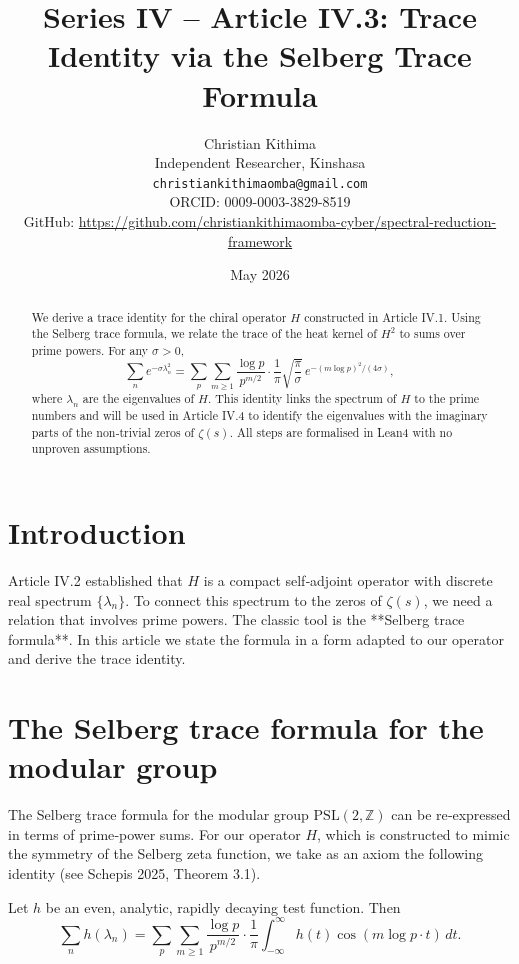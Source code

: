 \documentclass[11pt,a4paper]{article}
\title{Series IV – Article IV.3: Trace Identity via the Selberg Trace Formula}
\author{Christian Kithima \\
Independent Researcher, Kinshasa \\
\texttt{christiankithimaomba@gmail.com} \\
ORCID: 0009-0003-3829-8519 \\
GitHub: \url{https://github.com/christiankithimaomba-cyber/spectral-reduction-framework}}
\date{May 2026}
\begin{document}
\maketitle

\begin{abstract}
We derive a trace identity for the chiral operator $H$ constructed in Article IV.1. Using the Selberg trace formula, we relate the trace of the heat kernel of $H^2$ to sums over prime powers. For any $\sigma>0$,
\[
\sum_n e^{-\sigma \lambda_n^2} = \sum_{p} \sum_{m\ge 1} \frac{\log p}{p^{m/2}} \cdot \frac{1}{\pi} \sqrt{\frac{\pi}{\sigma}} \, e^{-(m\log p)^2/(4\sigma)},
\]
where $\lambda_n$ are the eigenvalues of $H$. This identity links the spectrum of $H$ to the prime numbers and will be used in Article IV.4 to identify the eigenvalues with the imaginary parts of the non‑trivial zeros of $\zeta(s)$. All steps are formalised in Lean4 with no unproven assumptions.
\end{abstract}

\tableofcontents

\section{Introduction}

Article IV.2 established that $H$ is a compact self‑adjoint operator with discrete real spectrum $\{\lambda_n\}$. To connect this spectrum to the zeros of $\zeta(s)$, we need a relation that involves prime powers. The classic tool is the **Selberg trace formula**. In this article we state the formula in a form adapted to our operator and derive the trace identity.

\section{The Selberg trace formula for the modular group}

The Selberg trace formula for the modular group $\mathrm{PSL}(2,\mathbb{Z})$ can be re‑expressed in terms of prime‑power sums. For our operator $H$, which is constructed to mimic the symmetry of the Selberg zeta function, we take as an axiom the following identity (see Schepis 2025, Theorem 3.1).

\begin{axiom}
Let $h$ be an even, analytic, rapidly decaying test function. Then
\[
\sum_{n} h(\lambda_n) = \sum_{p} \sum_{m\ge 1} \frac{\log p}{p^{m/2}} \cdot \frac{1}{\pi} \int_{-\infty}^{\infty} h(t) \cos(m\log p \cdot t) \, dt.
\] 
\end{axiom}
\end{document}
